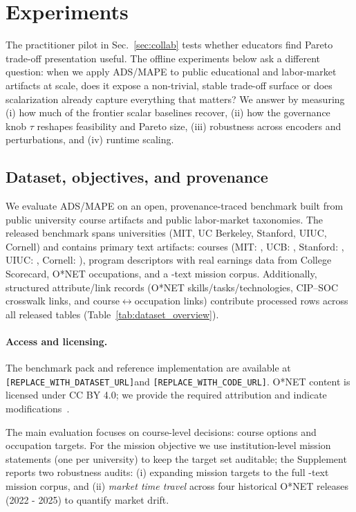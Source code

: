 \documentclass[sigconf,review]{acmart}
\newcommand{\BenchmarkURL}{\texttt{[REPLACE\_WITH\_DATASET\_URL]}}
\newcommand{\CodeURL}{\texttt{[REPLACE\_WITH\_CODE\_URL]}}
\newcommand{\ADS}{\textsc{ADS}\xspace}
\newcommand{\MAPE}{\textsc{MAPE}\xspace}
\begin{document}
\section{Experiments}

\label{sec:experiments}

The practitioner pilot in Sec.~\ref{sec:collab} tests whether educators find Pareto trade-off presentation useful. The offline experiments below ask a different question: when we apply \ADS/\MAPE to public educational and labor-market artifacts at scale, does it expose a non-trivial, stable trade-off surface or does scalarization already capture everything that matters? We answer by measuring (i) how much of the frontier scalar baselines recover, (ii) how the governance knob $\tau$ reshapes feasibility and Pareto size, (iii) robustness across encoders and perturbations, and (iv) runtime scaling.

\subsection{Dataset, objectives, and provenance}
\label{subsec:data}
We evaluate \ADS/\MAPE on an open, provenance-traced benchmark built from {public university course artifacts} and {public labor-market taxonomies}. The released benchmark spans {\NumUniversities} universities (MIT, UC Berkeley, Stanford, UIUC, Cornell) and contains {\NumPrimaryArtifacts} primary text artifacts: \NumCourses{} courses (MIT: \NumMIT, UCB: \NumUCB, Stanford: \NumStanford, UIUC: \NumUIUC, Cornell: \NumCornell), \NumPrograms{} program descriptors with real earnings data from College Scorecard, \NumOccupations{} O*NET occupations, and a \NumMissionsExpanded-text mission corpus. Additionally, {\NumAttributeRecords} structured attribute/link records (O*NET skills/tasks/technologies, CIP--SOC crosswalk links, and course$\leftrightarrow$occupation links) contribute {\NumProcessedRows} processed rows across all released tables (Table~\ref{tab:dataset_overview}).

\paragraph{Access and licensing.}
The benchmark pack and reference implementation are available at \BenchmarkURL and \CodeURL.
O*NET content is licensed under CC BY 4.0; we provide the required attribution and indicate modifications~\cite{onet_license_db}.


The {main evaluation} focuses on course-level decisions: \NumCourses course options and \NumOccupations occupation targets. For the mission objective we use {\NumMissionsMain} institution-level mission statements (one per university) to keep the target set auditable; the Supplement reports two robustness audits: (i) expanding mission targets to the full \NumMissionsExpanded-text mission corpus, and (ii) \emph{market time travel} across four historical O*NET releases (2022 - 2025) to quantify market drift.
\end{document}
